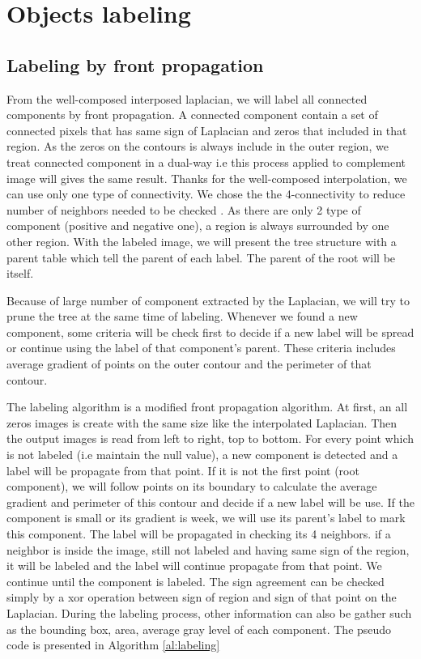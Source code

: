 \section{Objects labeling}

\subsection{Labeling by front propagation}
\par From the well-composed interposed laplacian, we will label all connected components by front propagation. A connected component contain a set of connected pixels that has same sign of Laplacian and zeros that included in that region. As the zeros on the contours is always include in the outer region, we treat connected component in a dual-way i.e this process applied to complement image will gives the same result. Thanks for the well-composed interpolation, we can use only one type of connectivity. We chose the the 4-connectivity to reduce number of neighbors needed to be checked . As there are only 2 type of component (positive and negative one), a region is always surrounded by one other region. With the labeled image, we will present the tree structure with a parent table which tell the parent of each label. The parent of the root will be itself.
\par
Because of large number of component extracted by the Laplacian, we will try to prune the tree at the same time of labeling. Whenever we found a new component, some criteria will be check first to decide if a new label will be spread or continue using the label of that component's parent. These criteria includes average gradient of points on the outer contour and the perimeter of that contour.  
\par
The labeling algorithm is a modified front propagation algorithm. At first, an all zeros images is create with the same size like the interpolated Laplacian. Then the output images is read from left to right, top to bottom. For every point which is not labeled (i.e maintain the null value), a new component is detected and a label will be propagate from that point. If it is not the first point (root component), we will follow points on its boundary to calculate the average gradient and perimeter of this contour and decide if a new label will be use. If the component is small or its gradient is week, we will use its parent's label to mark this component. The label will be propagated in checking its 4 neighbors. if a neighbor is inside the image, still not labeled and having same sign of the region, it will be labeled and the label will continue propagate from that point. We continue until the component is labeled. The sign agreement can be checked simply by a xor operation between sign of region and sign of that point on the Laplacian. During the labeling process, other information can also be gather such as the bounding box, area, average gray level of each component. The pseudo code is presented in Algorithm \autoref{al:labeling}
\par


